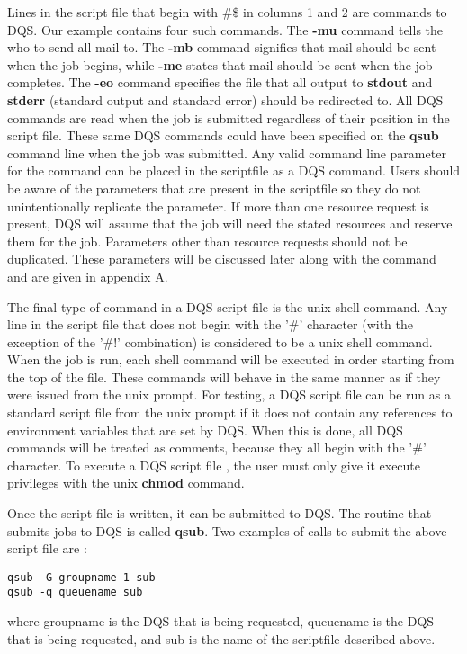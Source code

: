 Lines in the script file that begin with \#\$ in columns 1 and 2 are
commands to DQS.  Our example contains four such commands.  The
{\bf -mu} command
tells the \qmaster who to send all mail to.  The {\bf -mb} command
signifies that
mail should be sent when the job begins, while {\bf -me} states that
mail should
be sent when the job completes.  The {\bf -eo} command specifies the
file that all
output to {\bf stdout} and {\bf stderr} (standard output and standard
error) should be redirected to.
All DQS commands are read when the job is
submitted regardless of their position in the script file.
These same DQS commands could have been specified on the {\bf qsub} command
line when the job was submitted.
Any valid command line
parameter for the \qsub command can be placed in the scriptfile as a
DQS command.  Users should be aware of the parameters that are present in
the scriptfile so they do not unintentionally replicate the parameter.
If more than one resource request is present, DQS will assume that the job
will need the stated resources and reserve them for the job.  Parameters
other than resource requests should not be duplicated.
These parameters will be
discussed later along with the \qsub command and are given in appendix A.

The final type of command in a DQS script file is the unix shell
command.  Any line in the script file that does not begin with the
'\#' character (with the exception of the '\#!' combination)
is considered to be a unix shell command.  When the job
is run, each shell command will be executed in order starting from the
top of the file.  These commands will behave in the same manner as if
they were issued from the unix prompt.  For testing, a DQS script file
can be run as a standard script file from the unix prompt if it does not
contain any references to environment variables that are set by DQS.
When this
is done, all DQS commands will be treated as comments, because
they all begin with the '\#' character.  To execute a DQS script file
, the user must only give it execute privileges with
the unix {\bf chmod} command.

Once the script file is written, it can be submitted to DQS.
The routine that submits jobs to DQS
is called {\bf qsub}.  Two examples of \qsub calls to submit the above
script file are :
\begin{verbatim}
qsub -G groupname 1 sub
qsub -q queuename sub
\end{verbatim}
where groupname is the DQS \group that is being requested, queuename is
the DQS \queue that is being requested, and sub is the name of the
scriptfile described above.

